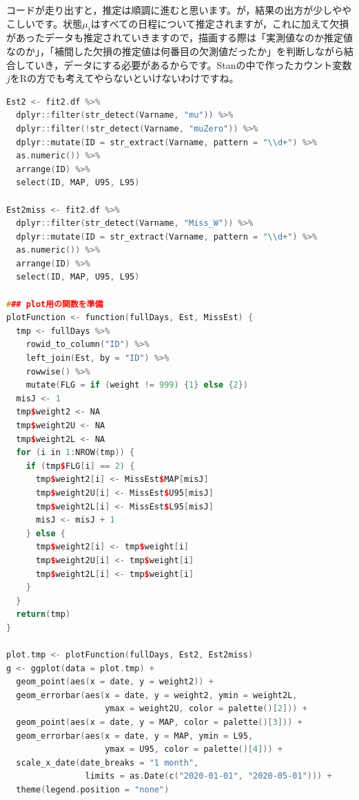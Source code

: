 \documentclass{ltjsbook}
\begin{document}
コードが走り出すと，推定は順調に進むと思います。が，結果の出方が少しややこしいです。状態$\mu_i$はすべての日程について推定されますが，これに加えて欠損があったデータも推定されていきますので，描画する際は「実測値なのか推定値なのか」，「補間した欠損の推定値は何番目の欠測値だったか」を判断しながら結合していき，データにする必要があるからです。Stanの中で作ったカウント変数$j$をRの方でも考えてやらないといけないわけですね。
\begin{lstlisting}[language=c++,label={code:16_07},caption={プロット用にデータを整形する関数とプロットのコード}]
Est2 <- fit2.df %>%
  dplyr::filter(str_detect(Varname, "mu")) %>%
  dplyr::filter(!str_detect(Varname, "muZero")) %>%
  dplyr::mutate(ID = str_extract(Varname, pattern = "\\d+") %>% 
  as.numeric()) %>%
  arrange(ID) %>%
  select(ID, MAP, U95, L95)

Est2miss <- fit2.df %>%
  dplyr::filter(str_detect(Varname, "Miss_W")) %>%
  dplyr::mutate(ID = str_extract(Varname, pattern = "\\d+") %>% 
  as.numeric()) %>%
  arrange(ID) %>%
  select(ID, MAP, U95, L95)

### plot用の関数を準備
plotFunction <- function(fullDays, Est, MissEst) {
  tmp <- fullDays %>%
    rowid_to_column("ID") %>%
    left_join(Est, by = "ID") %>%
    rowwise() %>%
    mutate(FLG = if (weight != 999) {1} else {2})
  misJ <- 1
  tmp$weight2 <- NA
  tmp$weight2U <- NA
  tmp$weight2L <- NA
  for (i in 1:NROW(tmp)) {
    if (tmp$FLG[i] == 2) {
      tmp$weight2[i] <- MissEst$MAP[misJ]
      tmp$weight2U[i] <- MissEst$U95[misJ]
      tmp$weight2L[i] <- MissEst$L95[misJ]
      misJ <- misJ + 1
    } else {
      tmp$weight2[i] <- tmp$weight[i]
      tmp$weight2U[i] <- tmp$weight[i]
      tmp$weight2L[i] <- tmp$weight[i]
    }
  }
  return(tmp)
}

plot.tmp <- plotFunction(fullDays, Est2, Est2miss)
g <- ggplot(data = plot.tmp) +
  geom_point(aes(x = date, y = weight2)) +
  geom_errorbar(aes(x = date, y = weight2, ymin = weight2L, 
                    ymax = weight2U, color = palette()[2])) +
  geom_point(aes(x = date, y = MAP, color = palette()[3])) +
  geom_errorbar(aes(x = date, y = MAP, ymin = L95, 
                    ymax = U95, color = palette()[4])) +
  scale_x_date(date_breaks = "1 month", 
                limits = as.Date(c("2020-01-01", "2020-05-01"))) +
  theme(legend.position = "none")
\end{lstlisting}
\end{document}
